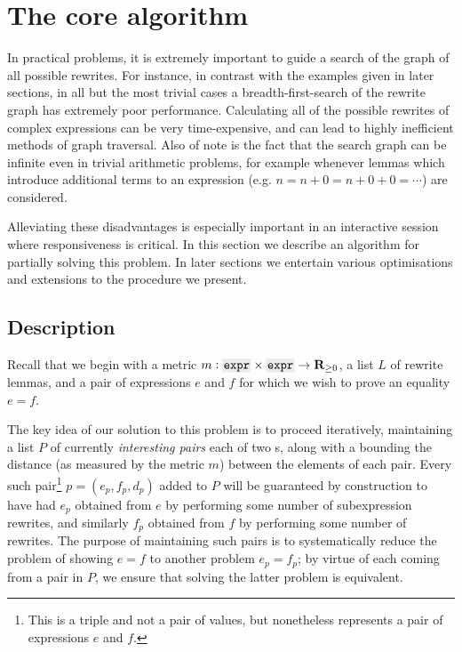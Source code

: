 \documentclass[12pt]{easychair}
\begin{document}
\section{The core algorithm}

In practical problems, it is extremely important to guide a search of the graph of all possible rewrites. For instance, in contrast with the examples given in later sections, in all but the most trivial cases a breadth-first-search of the rewrite graph has extremely poor performance. Calculating all of the possible rewrites of complex expressions can be very time-expensive, and can lead to highly inefficient methods of graph traversal. Also of note is the fact that the search graph can be infinite even in trivial arithmetic problems, for example whenever lemmas which introduce additional terms to an expression (e.g. $n = n + 0 = n + 0 + 0 = \cdots$) are considered.

Alleviating these disadvantages is especially important in an interactive session where responsiveness is critical. In this section we describe an algorithm for partially solving this problem. In later sections we entertain various optimisations and extensions to the procedure we present.

\subsection{Description}

Recall that we begin with a metric $m : \expr{} \times \expr{} \to \RR_{\geq 0}$, a list $L$ of rewrite lemmas, and a pair of expressions $e$ and $f$ for which we wish to prove an equality $e = f$.

The key idea of our solution to this problem is to proceed iteratively, maintaining a list $P$ of currently \textit{interesting pairs} each of two \expr{}s, along with a  bounding the distance (as measured by the metric $m$) between the elements of each pair. Every such pair\footnote{This is a triple and not a pair of values, but nonetheless represents a pair of expressions $e$ and $f$.} $p = (e_p, f_p, d_p)$ added to $P$ will be guaranteed by construction to have had $e_p$ obtained from $e$ by performing some number of subexpression rewrites, and similarly $f_p$ obtained from $f$ by performing some number of rewrites. The purpose of maintaining such pairs is to systematically reduce the problem of showing $e = f$ to another problem $e_p = f_p$; by virtue of each coming from a pair in $P$, we ensure that solving the latter problem is equivalent.
\end{document}
